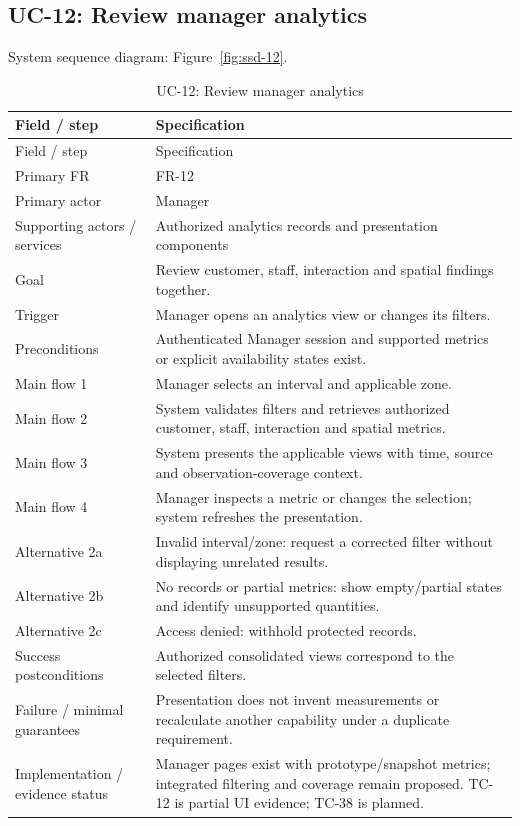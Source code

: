 \subsection*{UC-12: Review manager analytics}
\label{uc:12}
System sequence diagram: Figure~\ref{fig:ssd-12}.

\begin{longtable}{P{0.23\textwidth}P{0.67\textwidth}}
\caption{UC-12: Review manager analytics}\\
\toprule
Field / step & Specification\\
\midrule
\endfirsthead
\toprule
Field / step & Specification\\
\midrule
\endhead
Primary FR & FR-12\\
Primary actor & Manager\\
Supporting actors / services & Authorized analytics records and presentation components\\
Goal & Review customer, staff, interaction and spatial findings together.\\
Trigger & Manager opens an analytics view or changes its filters.\\
Preconditions & Authenticated Manager session and supported metrics or explicit availability states exist.\\
Main flow 1 & Manager selects an interval and applicable zone.\\
Main flow 2 & System validates filters and retrieves authorized customer, staff, interaction and spatial metrics.\\
Main flow 3 & System presents the applicable views with time, source and observation-coverage context.\\
Main flow 4 & Manager inspects a metric or changes the selection; system refreshes the presentation.\\
Alternative 2a & Invalid interval/zone: request a corrected filter without displaying unrelated results.\\
Alternative 2b & No records or partial metrics: show empty/partial states and identify unsupported quantities.\\
Alternative 2c & Access denied: withhold protected records.\\
Success postconditions & Authorized consolidated views correspond to the selected filters.\\
Failure / minimal guarantees & Presentation does not invent measurements or recalculate another capability under a duplicate requirement.\\
Implementation / evidence status & Manager pages exist with prototype/snapshot metrics; integrated filtering and coverage remain proposed. TC-12 is partial UI evidence; TC-38 is planned.\\
\bottomrule
\end{longtable}

